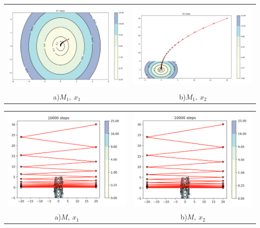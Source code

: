 \documentclass{article}
\theoremstyle{definition}
\theoremstyle{remark}
\begin{document}
\begin{center}
\begin{tabular}{cc}
\includegraphics[width=0.49\linewidth]{15.png} &
\includegraphics[width=0.49\linewidth]{16.png} \\
 a)$M_1,\ x_1$ & b)$M_1,\ x_2$\\
\end{tabular}
\end{center}
\begin{center}
\begin{tabular}{cc}
\includegraphics[width=0.49\linewidth]{17.png} &
\includegraphics[width=0.49\linewidth]{18.png} \\
 a)$M,\ x_1$ & b)$M,\ x_2$\\
\end{tabular}
\end{center}
\end{document}
